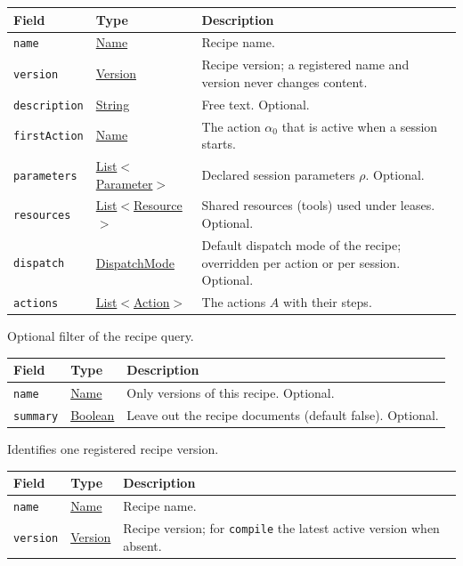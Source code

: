 \documentclass[a4paper]{arrowhead}
\newcommand{\mref}[1]{{\textcolor{ArrowheadPurple}{\hyperref[sec:model:#1]{#1}}}}
\newcommand{\pref}[1]{{\textcolor{ArrowheadGrey}{\hyperref[sec:model:primitives:#1]{#1}}}}
\begin{document}
{\small
\begin{longtable}{|p{3.9cm}|p{4.4cm}|p{7.5cm}|}

\hline
\rowcolor{gray!33} Field & Type & Description \\ \hline
\endhead
\texttt{name} & \pref{Name} & Recipe name. \\ \hline
\texttt{version} & \pref{Version} & Recipe version; a registered name and version never changes content. \\ \hline
\texttt{description} & \pref{String} & Free text. Optional. \\ \hline
\texttt{firstAction} & \pref{Name} & The action $\alpha_0$ that is active when a session starts. \\ \hline
\texttt{parameters} & \pref{List}$<$\mref{Parameter}$>$ & Declared session parameters $\rho$. Optional. \\ \hline
\texttt{resources} & \pref{List}$<$\mref{Resource}$>$ & Shared resources (tools) used under leases. Optional. \\ \hline
\texttt{dispatch} & \mref{DispatchMode} & Default dispatch mode of the recipe; overridden per action or per session. Optional. \\ \hline
\texttt{actions} & \pref{List}$<$\mref{Action}$>$ & The actions $A$ with their steps. \\ \hline
\end{longtable}
}

Optional filter of the recipe query.

{\small
\begin{longtable}{|p{3.9cm}|p{4.4cm}|p{7.5cm}|}

\hline
\rowcolor{gray!33} Field & Type & Description \\ \hline
\endhead
\texttt{name} & \pref{Name} & Only versions of this recipe. Optional. \\ \hline
\texttt{summary} & \pref{Boolean} & Leave out the recipe documents (default false). Optional. \\ \hline
\end{longtable}
}

Identifies one registered recipe version.

{\small
\begin{longtable}{|p{3.9cm}|p{4.4cm}|p{7.5cm}|}

\hline
\rowcolor{gray!33} Field & Type & Description \\ \hline
\endhead
\texttt{name} & \pref{Name} & Recipe name. \\ \hline
\texttt{version} & \pref{Version} & Recipe version; for \texttt{compile} the latest active version when absent. \\ \hline
\end{longtable}
}
\end{document}
